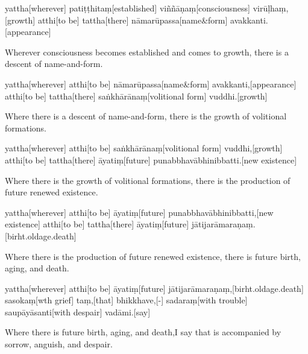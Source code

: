 \begin{samepage}
\begingl[glneveryline={\PaliGlossA,\PaliGlossB}]
yattha[wherever] patiṭṭhitaṃ[established] viññāṇaṃ[consciousness] virūḷhaṃ,[growth] atthi[to be] tattha[there] nāmarūpassa[name\&form] avakkanti.[appearance]
\endgl
\nopagebreak
\linespread{0.5}
\begin{spacin}{0.2}
{\PaliGlossFT Wherever consciousness becomes established and comes to growth, there is a descent of name-and-form.}
\end{spacin}
\vskip 12pt
\end{samepage}
\begin{samepage}
\begingl[glneveryline={\PaliGlossA,\PaliGlossB}]
yattha[wherever] atthi[to be] nāmarūpassa[name\&form] avakkanti,[appearance] atthi[to be] tattha[there] saṅkhārānaṃ[volitional form] vuddhi.[growth]
\endgl
\nopagebreak
\linespread{0.5}
\begin{spacin}{0.2}
{\PaliGlossFT Where there is a descent of name-and-form, there is the growth of volitional formations.}
\end{spacin}
\vskip 12pt
\end{samepage}
\begin{samepage}
\begingl[glneveryline={\PaliGlossA,\PaliGlossB}]
yattha[wherever] atthi[to be] saṅkhārānaṃ[volitional form] vuddhi,[growth] atthi[to be] tattha[there] āyatiṃ[future] punabbhavābhinibbatti.[new existence]
\endgl
\nopagebreak
\linespread{0.5}
\begin{spacin}{0.2}
{\PaliGlossFT Where there is the growth of volitional formations, there is the production of future renewed existence.}
\end{spacin}
\vskip 12pt
\end{samepage}
\begin{samepage}
\begingl[glneveryline={\PaliGlossA,\PaliGlossB}]
yattha[wherever] atthi[to be] āyatiṃ[future] punabbhavābhinibbatti,[new existence] atthi[to be] tattha[there] āyatiṃ[future] jātijarāmaraṇaṃ.[birht.oldage.death]
\endgl
\nopagebreak
\linespread{0.5}
\begin{spacin}{0.2}
{\PaliGlossFT Where there is the production of future renewed existence, there is future birth, aging, and death.}
\end{spacin}
\vskip 12pt
\end{samepage}
\begin{samepage}
\begingl[glneveryline={\PaliGlossA,\PaliGlossB}]
yattha[wherever] atthi[to be] āyatiṃ[future] jātijarāmaraṇaṃ,[birht.oldage.death] sasokaṃ[wth grief] taṃ,[that] bhikkhave,[-] sadaraṃ[with trouble] saupāyāsanti[with despair] vadāmi.[say]
\endgl
\nopagebreak
\linespread{0.5}
\begin{spacin}{0.2}
{\PaliGlossFT Where there is future birth, aging, and death,I say that is accompanied by sorrow, anguish, and despair.}
\end{spacin}
\vskip 12pt
\end{samepage}
